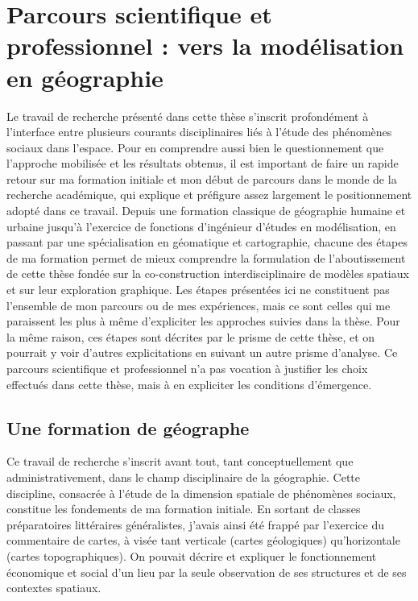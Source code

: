 \section{Parcours scientifique et professionnel : vers la modélisation en géographie \label{sec:formation}}

Le travail de recherche présenté dans cette thèse s'inscrit profondément à l'interface entre plusieurs courants disciplinaires liés à l'étude des phénomènes sociaux dans l'espace.
Pour en comprendre aussi bien le questionnement que l'approche mobilisée et les résultats obtenus, il est important de faire un rapide retour sur ma formation initiale et mon début de parcours dans le monde de la recherche académique, qui explique et préfigure assez largement le positionnement adopté dans ce travail.
Depuis une formation classique de géographie humaine et urbaine jusqu'à l'exercice de fonctions d'ingénieur d'études en modélisation, en passant par une spécialisation en géomatique et cartographie, chacune des étapes de ma formation permet de mieux comprendre la formulation de l'aboutissement de cette thèse fondée sur la co-construction interdisciplinaire de modèles spatiaux et sur leur exploration graphique.
Les étapes présentées ici ne constituent pas l'ensemble de mon parcours ou de mes expériences, mais ce sont celles qui me paraissent les plus à même d'expliciter les approches suivies dans la thèse.
Pour la même raison, ces étapes sont décrites par le prisme de cette thèse, et on pourrait y voir d'autres explicitations en suivant un autre prisme d'analyse.
Ce parcours scientifique et professionnel n'a pas vocation à justifier les choix effectués dans cette thèse, mais à en expliciter les conditions d'émergence.

\subsection{Une formation de géographe}

Ce travail de recherche s'inscrit avant tout, tant conceptuellement que administrativement, dans le champ disciplinaire de la géographie.
Cette discipline, consacrée à l'étude de la dimension spatiale de phénomènes sociaux, constitue les fondements de ma formation initiale.
En sortant de classes préparatoires littéraires généralistes, j'avais ainsi été frappé par l'exercice du commentaire de cartes, à visée tant verticale (cartes géologiques) qu'horizontale (cartes topographiques).
On pouvait décrire et expliquer le fonctionnement économique et social d'un lieu par la seule observation de ses structures et de ses contextes spatiaux.

